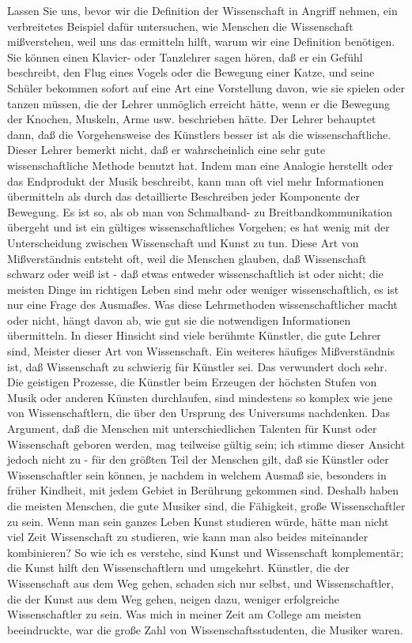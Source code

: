 Lassen Sie uns, bevor wir die Definition der Wissenschaft in Angriff nehmen, ein verbreitetes Beispiel dafür untersuchen, wie Menschen die Wissenschaft mißverstehen, weil uns das ermitteln hilft, warum wir eine Definition benötigen.
Sie können einen Klavier- oder Tanzlehrer sagen hören, daß er ein Gefühl beschreibt, den Flug eines Vogels oder die Bewegung einer Katze, und seine Schüler bekommen sofort auf eine Art eine Vorstellung davon, wie sie spielen oder tanzen müssen, die der Lehrer unmöglich erreicht hätte, wenn er die Bewegung der Knochen, Muskeln, Arme usw. beschrieben hätte.
Der Lehrer behauptet dann, daß die Vorgehensweise des Künstlers besser ist als die wissenschaftliche.
Dieser Lehrer bemerkt nicht, daß er wahrscheinlich eine sehr gute wissenschaftliche Methode benutzt hat.
Indem man eine Analogie herstellt oder das Endprodukt der Musik beschreibt, kann man oft viel mehr Informationen übermitteln als durch das detaillierte Beschreiben jeder Komponente der Bewegung.
Es ist so, als ob man von Schmalband- zu Breitbandkommunikation übergeht und ist ein gültiges wissenschaftliches Vorgehen; es hat wenig mit der Unterscheidung zwischen Wissenschaft und Kunst zu tun.
Diese Art von Mißverständnis entsteht oft, weil die Menschen glauben, daß Wissenschaft schwarz oder weiß ist - daß etwas entweder wissenschaftlich ist oder nicht; die meisten Dinge im richtigen Leben sind mehr oder weniger wissenschaftlich, es ist nur eine Frage des Ausmaßes.
Was diese Lehrmethoden wissenschaftlicher macht oder nicht, hängt davon ab, wie gut sie die notwendigen Informationen übermitteln.
In dieser Hinsicht sind viele berühmte Künstler, die gute Lehrer sind, Meister dieser Art von Wissenschaft.
Ein weiteres häufiges Mißverständnis ist, daß Wissenschaft zu schwierig für Künstler sei.
Das verwundert doch sehr.
Die geistigen Prozesse, die Künstler beim Erzeugen der höchsten Stufen von Musik oder anderen Künsten durchlaufen, sind mindestens so komplex wie jene von Wissenschaftlern, die über den Ursprung des Universums nachdenken.
Das Argument, daß die Menschen mit unterschiedlichen Talenten für Kunst oder Wissenschaft geboren werden, mag teilweise gültig sein; ich stimme dieser Ansicht jedoch nicht zu - für den größten Teil der Menschen gilt, daß sie Künstler oder Wissenschaftler sein können, je nachdem in welchem Ausmaß sie, besonders in früher Kindheit, mit jedem Gebiet in Berührung gekommen sind.
Deshalb haben die meisten Menschen, die gute Musiker sind, die Fähigkeit, große Wissenschaftler zu sein.
Wenn man sein ganzes Leben Kunst studieren würde, hätte man nicht viel Zeit Wissenschaft zu studieren, wie kann man also beides miteinander kombinieren?
So wie ich es verstehe, sind Kunst und Wissenschaft komplementär; die Kunst hilft den Wissenschaftlern und umgekehrt.
Künstler, die der Wissenschaft aus dem Weg gehen, schaden sich nur selbst, und Wissenschaftler, die der Kunst aus dem Weg gehen, neigen dazu, weniger erfolgreiche Wissenschaftler zu sein.
Was mich in meiner Zeit am College am meisten beeindruckte, war die große Zahl von Wissenschaftsstudenten, die Musiker waren.
 


